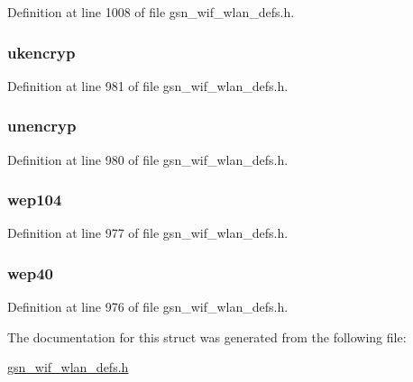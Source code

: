 Definition at line 1008 of file gsn\_\-wif\_\-wlan\_\-defs.h.

\hypertarget{a00398_af0e3049236e039064d544397e376c31b}{
\subsubsection[{ukencryp}]{ {\bf ukencryp}}}
\label{a00398_af0e3049236e039064d544397e376c31b}


Definition at line 981 of file gsn\_\-wif\_\-wlan\_\-defs.h.

\hypertarget{a00398_a5cf4008170a4dba8a5299071161cef46}{
\subsubsection[{unencryp}]{ {\bf unencryp}}}
\label{a00398_a5cf4008170a4dba8a5299071161cef46}


Definition at line 980 of file gsn\_\-wif\_\-wlan\_\-defs.h.

\hypertarget{a00398_ab95f62b583a03134163d1f1fd4573a02}{
\subsubsection[{wep104}]{ {\bf wep104}}}
\label{a00398_ab95f62b583a03134163d1f1fd4573a02}


Definition at line 977 of file gsn\_\-wif\_\-wlan\_\-defs.h.

\hypertarget{a00398_af30857fde9d06828d91cff11936bee59}{
\subsubsection[{wep40}]{ {\bf wep40}}}
\label{a00398_af30857fde9d06828d91cff11936bee59}


Definition at line 976 of file gsn\_\-wif\_\-wlan\_\-defs.h.



The documentation for this struct was generated from the following file:\begin{DoxyCompactItemize}
\item 
\hyperlink{a00613}{gsn\_\-wif\_\-wlan\_\-defs.h}\end{DoxyCompactItemize}
